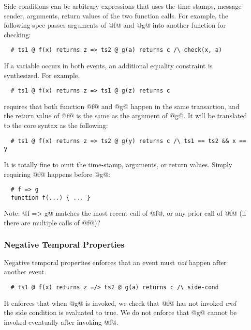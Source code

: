 \documentclass[acmsmall,review,anonymous]{acmart}\settopmatter{printfolios=true,printccs=false,printacmref=false}
\begin{document}
Side conditions can be arbitrary expressions that uses the time-stamps, message
sender, arguments, return values of the two function calls.
For example, the following spec passes arguments of @f@ and @g@ into
another function for checking:

\begin{lstlisting}
  # ts1 @ f(x) returns z => ts2 @ g(a) returns c /\ check(x, a)
\end{lstlisting}

If a variable occurs in both events, an additional equality constraint
is synthesized.  For example,
\begin{lstlisting}
  # ts1 @ f(x) returns z => ts1 @ g(z) returns c
\end{lstlisting}
requires that both function @f@ and @g@ happen in the same transaction,
and the return value of @f@ is the same as the argument of @g@.
It will be translated to the core syntax as the following:
\begin{lstlisting}
  # ts1 @ f(x) returns z => ts2 @ g(y) returns c /\ ts1 == ts2 && x == y
\end{lstlisting}

It is totally fine to omit the time-stamp, arguments, or return values.
Simply requiring @f@ happens before @g@:
\begin{lstlisting}
  # f => g
  function f(...) { ... }
\end{lstlisting}


Note: @f => g@ matches the most recent call of @f@,
or any prior call of @f@ (if there are multiple calls of @f@)?



\subsubsection{Negative Temporal Properties}

Negative temporal properties enforces that an event must \emph{not}
happen after another event.

\begin{lstlisting}
  # ts1 @ f(x) returns z =/> ts2 @ g(a) returns c /\ side-cond
\end{lstlisting}
It enforces that when @g@ is invoked, we check that @f@ has not invoked
\emph{and} the side condition is evaluated to true.
We do not enforce that @g@ cannot be invoked eventually
after invoking @f@.
\end{document}
